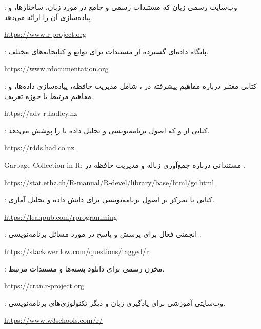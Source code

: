 \documentclass[11pt, a4paper, oneside]{book}
\begin{document}
	
	\begin{thebibliography}{9}
		
		: وب‌سایت رسمی زبان  که مستندات رسمی و جامع در مورد زبان، ساختارها، و پیاده‌سازی آن را ارائه می‌دهد.  
		
		\url{https://www.r-project.org}
		
		: پایگاه داده‌ای گسترده از مستندات  برای توابع و کتابخانه‌های مختلف.
		  
		\url{https://www.rdocumentation.org}
		
		: کتابی معتبر درباره مفاهیم پیشرفته در ، شامل مدیریت حافظه، پیاده‌سازی داده‌ها، و مفاهیم مرتبط با حوزه تعریف.  
		
		\url{https://adv-r.hadley.nz}
		
		: کتابی از  و  که اصول برنامه‌نویسی و تحلیل داده با  را پوشش می‌دهد. 
		 
		\url{https://r4ds.had.co.nz}
		
		Garbage Collection in R: مستنداتی درباره جمع‌آوری زباله و مدیریت حافظه در . 
		 
		\url{https://stat.ethz.ch/R-manual/R-devel/library/base/html/gc.html}
		
		: کتابی با تمرکز بر اصول برنامه‌نویسی  برای دانش داده و تحلیل آماری.  
		
		\url{https://leanpub.com/rprogramming}
		
		: انجمنی فعال برای پرسش و پاسخ در مورد مسائل برنامه‌نویسی .  
		
		\url{https://stackoverflow.com/questions/tagged/r}
		
		: مخزن رسمی  برای دانلود بسته‌ها و مستندات مرتبط.  
		
		\url{https://cran.r-project.org}
		
		: وب‌سایتی آموزشی برای یادگیری زبان  و دیگر تکنولوژی‌های برنامه‌نویسی.  
		
		\url{https://www.w3schools.com/r/}
		
	\end{thebibliography}
	
	
\end{document}
